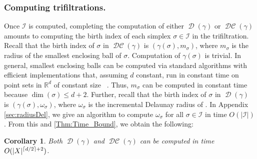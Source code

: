 \documentclass[11pt]{amsart}
\DeclarePairedDelimiter\ceil{\lceil}{\rceil}
\DeclarePairedDelimiter\abs{\lvert}{\rvert}
\newcommand{\R}{\mathbb{R}} %
\DeclareMathOperator{\Del}{\mathcal{D}}
\DeclareMathOperator{\DelCech}{\mathcal{DC}}
\newcommand{\Incr}[0]{\mathcal{I}}
\renewcommand{\subparagraph}[1]{\subsubsection*{\textbf{\textup{#1}}}}
\theoremstyle{plain}
\newtheorem{corollary}[theorem]{Corollary}
\theoremstyle{definition}
\theoremstyle{remark}
\begin{document}
\subparagraph{Computing trifiltrations.} 
Once $\Incr$ is computed, completing the computation of either $\Del(\gamma)$ or
$\DelCech(\gamma)$ amounts to computing the birth index of each simplex $\sigma\in\Incr$ in the trifiltration.
Recall that the birth index of $\sigma$ in $\DelCech(\gamma)$ is $(\gamma(\sigma), m_\sigma)$, where $m_\sigma$ is the radius of the smallest enclosing ball of $\sigma$.  Computation of $\gamma(\sigma)$  is trivial.  In general, smallest enclosing balls can be computed via standard algorithms with efficient implementations that, assuming  $d$ constant, run in constant time on point sets in $\R^d$ of constant size~\cite{welzlSmallestEnclosingDisks1991,fischerFastSmallestEnclosingBallComputation2003,fischerSmallestEnclosingBall2004,gartnerFastRobustSmallest1999,cgal:fghhs-bv-24a} .  Thus, $m_\sigma$ can be computed in constant time because $\dim(\sigma)\leq d+2$.  Further, recall that the birth index of $\sigma$ in $\Del(\gamma)$ is $(\gamma(\sigma), \omega_\sigma)$, where $\omega_\sigma$ is the incremental Delaunay radius of .  In Appendix \ref{sec:radiusDel}, we give an algorithm to compute $\omega_\sigma$  for all $\sigma\in\Incr$ in time $O(|\Incr|)$.  From this and \cref{Thm:Time_Bound}, we obtain the following:
%
\begin{corollary}\label{Thm:Filtration_Time_Bound}
Both  $\Del(\gamma)$ and $\DelCech(\gamma)$ can be computed in time $O(\abs{X}^{\ceil{d/2}+2})$.
\end{corollary}
%
%
\end{document}
